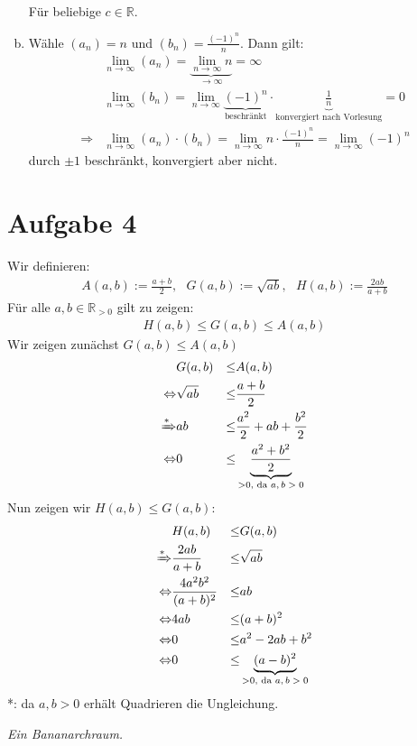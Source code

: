 \documentclass{scrreprt}
\newcommand{\RR}{\mathbb{R}}
\begin{document}
\begin{enumerate}[(a)]
\begin{align*}
			\end{align*}
			Für beliebige $c \in \RR$.
		\item
			Wähle $(a_n) = n$ und $(b_n) = \frac{(-1)^n}{n}$. Dann gilt:
			\begin{align*}
				&\lim\limits_{n \to \infty} (a_n) = \underbrace{\lim\limits_{n \to \infty} n}_{\rightarrow\infty} = \infty\\
				&\lim\limits_{n \to \infty} (b_n) = \lim\limits_{n \to \infty}\underbrace{(-1)^n}_{\text{beschränkt}} \cdot \underbrace{\frac{1}{n}}_{\text{konvergiert nach Vorlesung}} = 0 \\
				\Rightarrow& \lim\limits_{n \to \infty} (a_n) \cdot (b_n) = \lim\limits_{n \to \infty} n \cdot \frac{(-1)^n}{n} = \lim\limits_{n \to \infty} (-1)^n
			\end{align*}
			durch $\pm 1$ beschränkt, konvergiert aber nicht.
	\end{enumerate}

	\section*{Aufgabe 4}
	Wir definieren:
	\begin{align*}
		A(a,b) := \frac{a+b}{2}, \text{\ \ \ \ }G(a,b) := \sqrt{ab},\text{\ \ \ \ } H(a,b) := \frac{2ab}{a+b}
	\end{align*}
	Für alle $a,b \in \RR_{>0}$ gilt zu zeigen:
	\begin{align*}
		H(a,b) \leq G(a,b) \leq A(a,b)
	\end{align*}
	Wir zeigen zunächst $G(a,b) \leq A(a,b)$
	\begin{align*}
		&G(a,b) &\leq& A(a,b)\\
		\Leftrightarrow &\sqrt{ab}&\leq &\frac{a+b}{2}\\
		\xRightarrow{*} & ab &\leq &\frac{a^2}{2} + ab + \frac{b^2}{2}\\
		\Leftrightarrow & 0 &\leq &\underbrace{\frac{a^2 + b^2}{2}}_{>0 \text{, da $a,b > 0$}}\\
	\end{align*}
	Nun zeigen wir $H(a,b) \leq G(a,b)$:
	\begin{align*}
		&H(a,b) & \leq& G(a,b)\\
		\xRightarrow{*} &\frac{2ab}{a+b} &\leq& \sqrt{ab}\\
		\Leftrightarrow &\frac{4a^2b^2}{(a+b)^2} &\leq& ab\\
		\Leftrightarrow &4ab &\leq& (a+b)^2\\
		\Leftrightarrow &0 &\leq& a^2 - 2ab + b^2 \\
		\Leftrightarrow &0 &\leq& \underbrace{(a-b)^2}_{>0, \text{ da $a,b > 0$}}
	\end{align*}
	*: da $a,b > 0$ erhält Quadrieren die Ungleichung.
	
	\vfill
	\emph{Ein Bananarchraum.}

	
\end{document}
